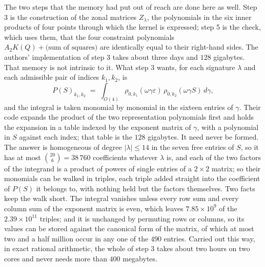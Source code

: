 \documentclass[11pt,reqno]{amsart}
\renewcommand{\_}{\origunderscore\allowbreak}
\numberwithin{equation}{section}
\theoremstyle{plain}
\theoremstyle{definition}
\theoremstyle{remark}
\begin{document}
The two steps that the memory had put out of reach are done here as well.
Step 3 is the construction of the zonal matrices $Z_\lambda$, the polynomials
in the six inner products of four points through which the kernel is
expressed; step 5 is the check, which uses them, that the four constraint
polynomials $A_2K(Q)+\text{(sum of squares)}$ are identically equal to their
right-hand sides. The authors' implementation of step 3 takes about three days
and $128$ gigabytes. That memory is not intrinsic to it. What step 3 wants,
for each signature $\lambda$ and each admissible pair of indices $k_1,k_2$, is
\[
  P(S)_{k_1,k_2}\;=\;\int_{O(4)}\rho_{0,k_1}(\omega\gamma\varepsilon)\,
  \rho_{0,k_2}(\omega\gamma S)\,d\gamma,
\]
and the integral is taken monomial by monomial in the sixteen entries of
$\gamma$. Their code expands the product of the two representation
polynomials first and holds the expansion in a table indexed by the exponent
matrix of $\gamma$, with a polynomial in $S$ against each index; that table is
the $128$ gigabytes. It need never be formed. The answer is homogeneous of
degree $|\lambda|\le14$ in the seven free entries of $S$, so it has at most
$\binom{20}{6}=38\,760$ coefficients whatever $\lambda$ is, and each of the
two factors of the integrand is a product of powers of single entries of a
$2\times2$ matrix; so their monomials can be walked in triples, each triple
added straight into the coefficient of $P(S)$ it belongs to, with nothing held
but the factors themselves. Two facts keep the walk short. The integral
vanishes unless every row sum and every column sum of the exponent matrix is
even, which leaves $7.85\times10^{9}$ of the $2.39\times10^{11}$ triples; and
it is unchanged by permuting rows or columns, so its values can be stored
against the canonical form of the matrix, of which at most two and a half
million occur in any one of the $490$ entries. Carried out this way, in exact
rational arithmetic, the whole of step 3 takes about two hours on two cores
and never needs more than $400$ megabytes.
\end{document}
